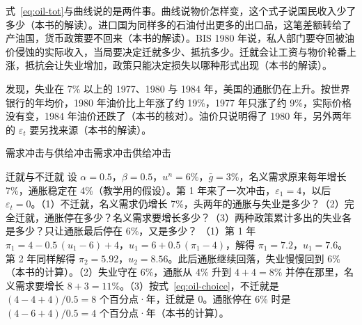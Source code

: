 式~\eqref{eq:oil-tot}与曲线说的是两件事。曲线说物价怎样变，这个式子说国民收入少了多少（本书的解读）。进口国为同样多的石油付出更多的出口品，这笔差额转给了产油国，货币政策要不回来（本书的解读）。BIS 1980 年说，私人部门要夺回被油价侵蚀的实际收入，当局要决定迁就多少、抵抗多少\cite{bis1980}。迁就会让工资与物价轮番上涨，抵抗会让失业增加，政策只能决定损失以哪种形式出现（本书的解读）。

发现，失业在 7\% 以上的 1977、1980 与 1984 年，美国的通胀仍在上升。按世界银行的年均价，1980 年油价比上年涨了约 19\%，1977 年只涨了约 9\%，实际价格没有变，1984 年油价还跌了（本书的核对）。油价只说明得了 1980 年，另外两年的 $\varepsilon_t$ 要另找来源（本书的解读）。

\begin{compare}{需求冲击与供给冲击}{需求冲击}{供给冲击}
\end{compare}

\begin{example}{迁就与不迁就}\label{ex:oil-paths}
设 $\alpha=0.5$，$\beta=0.5$，$u^{n}=6\%$，$\bar g=3\%$，名义需求原来每年增长 7\%，通胀稳定在 4\%（教学用的假设）。第 1 年来了一次冲击，$\varepsilon_1=4$，以后 $\varepsilon_t=0$。（1）不迁就，名义需求仍增长 7\%，头两年的通胀与失业是多少？（2）完全迁就，通胀停在多少？名义需求要增长多少？（3）两种政策累计多出的失业各是多少？只让通胀最后停在 6\%，又是多少？
\solution
（1）第 1 年 $\pi_1=4-0.5\,(u_1-6)+4$，$u_1=6+0.5\,(\pi_1-4)$，解得 $\pi_1=7.2$，$u_1=7.6$。第 2 年同样解得 $\pi_2=5.92$，$u_2=8.56$。此后通胀继续回落，失业慢慢回到 6\%（本书的计算）。（2）失业守在 6\%，通胀从 4\% 升到 $4+4=8\%$ 并停在那里，名义需求要增长 $8+3=11\%$。（3）按式~\eqref{eq:oil-choice}，不迁就是 $(4-4+4)/0.5=8$ 个百分点·年，迁就是 0。通胀停在 6\% 时是 $(4-6+4)/0.5=4$ 个百分点·年（本书的计算）。
\end{example}


